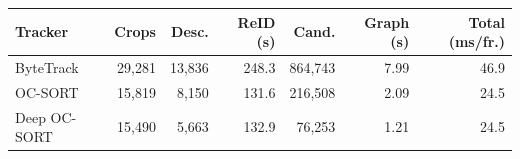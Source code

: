 \begin{tabular}{lrrrrrr}
\toprule
Tracker & Crops & Desc. & ReID (s) & Cand. & Graph (s) & Total (ms/fr.) \\
\midrule
ByteTrack & 29,281 & 13,836 & 248.3 & 864,743 & 7.99 & 46.9 \\
OC-SORT & 15,819 & 8,150 & 131.6 & 216,508 & 2.09 & 24.5 \\
Deep OC-SORT & 15,490 & 5,663 & 132.9 & 76,253 & 1.21 & 24.5 \\
\bottomrule
\end{tabular}
